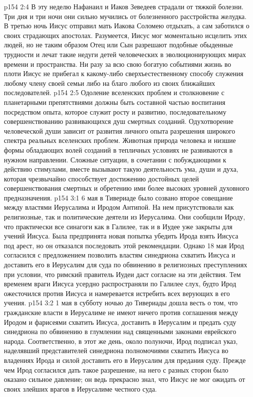 \vs p154 2:4 \pc В эту неделю Нафанаил и Иаков Зеведеев страдали от тяжкой болезни. Три дня и три ночи они сильно мучились от болезненного расстройства желудка. В третью ночь Иисус отправил мать Иакова Соломею отдыхать, а сам заботился о своих страдающих апостолах. Разумеется, Иисус мог моментально исцелить этих людей, но не таким образом Отец или Сын разрешают подобные обыденные трудности и лечат такие недуги детей человеческих в эволюционирующих мирах времени и пространства. Ни разу за всю свою богатую событиями жизнь во плоти Иисус не прибегал к какому\hyp{}либо сверхъестественному способу служения любому члену своей семьи либо на благо любого из своих ближайших последователей.
\vs p154 2:5 Одоление вселенских проблем и столкновение с планетарными препятствиями должны быть составной частью воспитания посредством опыта, которое служит росту и развитию, последовательному совершенствованию развивающихся душ смертных созданий. Одухотворение человеческой души зависит от развития личного опыта разрешения широкого спектра реальных вселенских проблем. Животная природа человека и низшие формы обладающих волей созданий в тепличных условиях не развиваются в нужном направлении. Сложные ситуации, в сочетании с побуждающими к действию стимулами, вместе вызывают такую деятельность ума, души и духа, которая чрезвычайно способствует достижению достойных целей совершенствования смертных и обретению ими более высоких уровней духовного предназначения.
\vs p154 3:1 6 мая в Тивериаде было созвано второе совещание между властями Иерусалима и Иродом Антипой. На нем присутствовали как религиозные, так и политические деятели из Иерусалима. Они сообщили Ироду, что практически все синагоги как в Галилее, так и в Иудее уже закрыты для учений Иисуса. Была предпринята новая попытка убедить Ирода взять Иисуса под арест, но он отказался последовать этой рекомендации. Однако 18 мая Ирод согласился с предложением позволить властям синедриона схватить Иисуса и доставить его в Иерусалим для суда по обвинению в религиозных преступлениях при условии, что римский правитель Иудеи даст согласие на эти действия. Тем временем враги Иисуса усердно распространяли по Галилее слух, будто Ирод ожесточился против Иисуса и намеревается истребить всех верующих в его учения.
\vs p154 3:2 1 мая в субботу ночью до Тивериады дошла весть о том, что гражданские власти в Иерусалиме не имеют ничего против соглашения между Иродом и фарисеями схватить Иисуса, доставить в Иерусалим и предать суду синедриона по обвинению в глумлении над священными законами еврейского народа. Соответственно, в этот же день, около полуночи, Ирод подписал указ, наделявший представителей синедриона полномочиями схватить Иисуса во владениях Ирода и силой доставить его в Иерусалим для предания суду. Прежде чем Ирод согласился дать такое разрешение, на него с разных сторон было оказано сильное давление; он ведь прекрасно знал, что Иисус не мог ожидать от своих злейших врагов в Иерусалиме честного суда.
